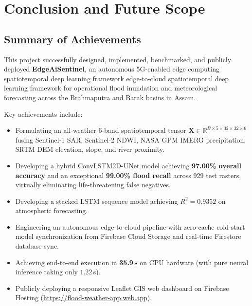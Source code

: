 \documentclass[12pt,a4paper,oneside]{report}
\begin{document}
\chapter{Conclusion and Future Scope}
\label{chap:conclusion}

\section{Summary of Achievements}
This project successfully designed, implemented, benchmarked, and publicly deployed \textbf{EdgeAiSentinel}, an autonomous 5G-enabled edge computing spatiotemporal deep learning framework edge-to-cloud spatiotemporal deep learning framework for operational flood inundation and meteorological forecasting across the Brahmaputra and Barak basins in Assam.

Key achievements include:
\begin{itemize}
    \item Formulating an all-weather 6-band spatiotemporal tensor $\mathbf{X} \in \mathbb{R}^{B \times 5 \times 32 \times 32 \times 6}$ fusing Sentinel-1 SAR, Sentinel-2 NDWI, NASA GPM IMERG precipitation, SRTM DEM elevation, slope, and river proximity.
    \item Developing a hybrid ConvLSTM2D-UNet model achieving \textbf{97.00\% overall accuracy} and an exceptional \textbf{99.00\% flood recall} across 929 test rasters, virtually eliminating life-threatening false negatives.
    \item Developing a stacked LSTM sequence model achieving $R^2 = \mathbf{0.9352}$ on atmospheric forecasting.
    \item Engineering an autonomous edge-to-cloud pipeline with zero-cache cold-start model synchronization from Firebase Cloud Storage and real-time Firestore database sync.
    \item Achieving end-to-end execution in \textbf{35.9\,s} on CPU hardware (with pure neural inference taking only $1.22$\,s).
    \item Publicly deploying a responsive Leaflet GIS web dashboard on Firebase Hosting (\url{https://flood-weather-app.web.app}).
\end{itemize}
\end{document}
